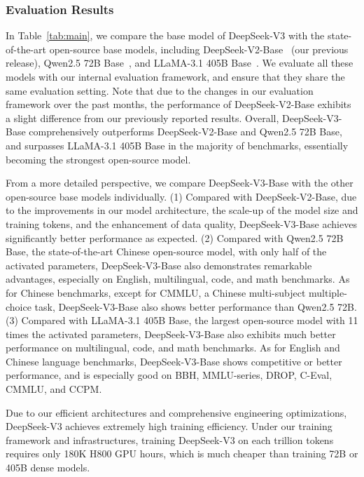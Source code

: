 \documentclass[11pt, a4paper, logo, copyright, nonumbering]{deepseek}
\newcommand{\dsvii}{DeepSeek-V2}
\newcommand{\dsviii}{DeepSeek-V3}
\begin{document}
\begin{CJK*}{UTF8}{gbsn}
\subsubsection{Evaluation Results}

In Table~\ref{tab:main}, we compare the base model of \dsviii{} with the state-of-the-art open-source base models, including \dsvii{}-Base~\citep{dsvii} (our previous release), Qwen2.5 72B Base~\citep{qwen2_5}, and LLaMA-3.1 405B Base~\citep{llama3_1_405b}.
We evaluate all these models with our internal evaluation framework, and ensure that they share the same evaluation setting. 
Note that due to the changes in our evaluation framework over the past months, the performance of \dsvii{}-Base exhibits a slight difference from our previously reported results.
Overall, \dsviii{}-Base comprehensively outperforms \dsvii{}-Base and Qwen2.5 72B Base, and surpasses LLaMA-3.1 405B Base in the majority of benchmarks, essentially becoming the strongest open-source model.  

From a more detailed perspective, we compare \dsviii{}-Base with the other open-source base models individually.
(1) 
Compared with \dsvii{}-Base, due to the improvements in our model architecture, the scale-up of the model size and training tokens, and the enhancement of data quality, \dsviii{}-Base achieves significantly better performance as expected.
(2)
Compared with Qwen2.5 72B Base, the state-of-the-art Chinese open-source model, with only half of the activated parameters, \dsviii{}-Base also demonstrates remarkable advantages, especially on English, multilingual, code, and math benchmarks. 
As for Chinese benchmarks, except for CMMLU, a Chinese multi-subject multiple-choice task, \dsviii{}-Base also shows better performance than Qwen2.5 72B. 
(3)
Compared with LLaMA-3.1 405B Base, the largest open-source model with 11 times the activated parameters, \dsviii{}-Base also exhibits much better performance on multilingual, code, and math benchmarks. 
As for English and Chinese language benchmarks, \dsviii{}-Base shows competitive or better performance, and is especially good on BBH, MMLU-series, DROP, C-Eval, CMMLU, and CCPM. 

Due to our efficient architectures and comprehensive engineering optimizations, \dsviii{} achieves extremely high training efficiency. 
Under our training framework and infrastructures, training \dsviii{} on each trillion tokens requires only 180K H800 GPU hours, which is much cheaper than training 72B or 405B dense models. 


\end{CJK*}
\end{document}
